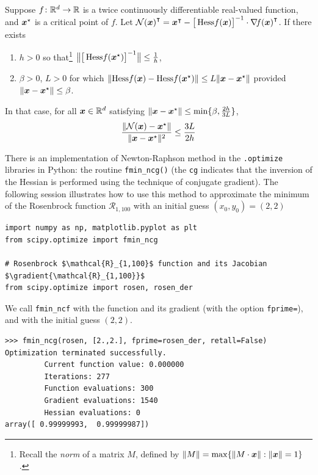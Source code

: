 \begin{theorem}\label{theorem:QuadraticConvergence}
Suppose $f\colon \mathbb{R}^d \to \mathbb{R}$ is a twice continuously differentiable real-valued function, and $\boldsymbol{x}^{\star}$ is a critical point of $f$. Let ${\mathcal{N}(\boldsymbol{x})}^\intercal = {\boldsymbol{x}}^\intercal - \big[ \mathop{\mathrm{Hess}{f}}(\boldsymbol{x}) \big]^{-1} \cdot {\mathop{\nabla\! {f}}(\boldsymbol{x})}^\intercal$. If there exists 
\begin{enumerate}
	\item $h>0$ so that\footnote{Recall the \emph{norm} of a matrix $M$, defined by $\lVert M \rVert = \max\{ \lVert M\cdot \boldsymbol{x} \rVert : \lVert \boldsymbol{x} \rVert=1 \}$.} $\big\lVert \big[ \mathop{\mathrm{Hess}{f}}(\boldsymbol{x}^{\star})\big]^{-1} \big\rVert \leq \tfrac{1}{h}$,
	\item $\beta>0$, $L>0$ for which $\lVert \mathop{\mathrm{Hess}{f}}(\boldsymbol{x}) - \mathop{\mathrm{Hess}{f}}(\boldsymbol{x}^{\star}) \rVert \leq L \lVert  \boldsymbol{x} - \boldsymbol{x}^{\star}  \rVert$ provided $\lVert  \boldsymbol{x} - \boldsymbol{x}^{\star}  \rVert\leq \beta$.
\end{enumerate}
In that case, for all $\boldsymbol{x} \in \mathbb{R}^d$ satisfying $\lVert  \boldsymbol{x} - \boldsymbol{x}^{\star}  \rVert\leq \min \{\beta, \tfrac{2h}{3L} \}$,
\begin{equation*}
\frac{\lVert  \mathcal{N}(\boldsymbol{x}) - \boldsymbol{x}^{\star}  \rVert}{\lVert \boldsymbol{x} - \boldsymbol{x}^{\star} \rVert^2} \leq \frac{3L}{2h}
\end{equation*}
\end{theorem}

\begin{example}
There is an implementation of Newton-Raphson method in the \scipy\texttt{.optimize} libraries in Python: the routine \texttt{fmin\_ncg()} (the \texttt{cg} indicates that the inversion of the Hessian is performed using the technique of conjugate gradient).  The following session illustrates how to use this method to approximate the minimum of the Rosenbrock function $\mathcal{R}_{1,100}$ with an initial guess $(x_0, y_0) = (2,2)$

\begin{verbatim}
import numpy as np, matplotlib.pyplot as plt 
from scipy.optimize import fmin_ncg

# Rosenbrock $\mathcal{R}_{1,100}$ function and its Jacobian $\gradient{\mathcal{R}_{1,100}}$
from scipy.optimize import rosen, rosen_der
\end{verbatim}

We call \texttt{fmin\_ncf} with the function and its gradient (with the option \texttt{fprime=}), and with the initial guess $(2,2)$.

\begin{verbatim}
>>> fmin_ncg(rosen, [2.,2.], fprime=rosen_der, retall=False)
Optimization terminated successfully.
         Current function value: 0.000000
         Iterations: 277
         Function evaluations: 300
         Gradient evaluations: 1540
         Hessian evaluations: 0
array([ 0.99999993,  0.99999987])
\end{verbatim}
\end{example}
